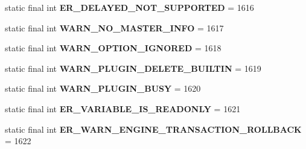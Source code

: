 \begin{DoxyCompactItemize}
\item 
\mbox{\label{classcom_1_1mysql_1_1jdbc_1_1_mysql_error_numbers_ac396818a5c4ef11518d486df9efae086}} 
static final int {\bfseries E\+R\+\_\+\+D\+E\+L\+A\+Y\+E\+D\+\_\+\+N\+O\+T\+\_\+\+S\+U\+P\+P\+O\+R\+T\+ED} = 1616
\item 
\mbox{\label{classcom_1_1mysql_1_1jdbc_1_1_mysql_error_numbers_a663931d5bfd87c909948b18f526e1e4d}} 
static final int {\bfseries W\+A\+R\+N\+\_\+\+N\+O\+\_\+\+M\+A\+S\+T\+E\+R\+\_\+\+I\+N\+FO} = 1617
\item 
\mbox{\label{classcom_1_1mysql_1_1jdbc_1_1_mysql_error_numbers_a7ef3656599623990e671daf94a96783d}} 
static final int {\bfseries W\+A\+R\+N\+\_\+\+O\+P\+T\+I\+O\+N\+\_\+\+I\+G\+N\+O\+R\+ED} = 1618
\item 
\mbox{\label{classcom_1_1mysql_1_1jdbc_1_1_mysql_error_numbers_a14f0162bad05281374c4ade03df44727}} 
static final int {\bfseries W\+A\+R\+N\+\_\+\+P\+L\+U\+G\+I\+N\+\_\+\+D\+E\+L\+E\+T\+E\+\_\+\+B\+U\+I\+L\+T\+IN} = 1619
\item 
\mbox{\label{classcom_1_1mysql_1_1jdbc_1_1_mysql_error_numbers_af66c21b2e3e7bbca2f5fe49baef085d7}} 
static final int {\bfseries W\+A\+R\+N\+\_\+\+P\+L\+U\+G\+I\+N\+\_\+\+B\+U\+SY} = 1620
\item 
\mbox{\label{classcom_1_1mysql_1_1jdbc_1_1_mysql_error_numbers_a4d0851e7e2a830c56e5d4067943a2699}} 
static final int {\bfseries E\+R\+\_\+\+V\+A\+R\+I\+A\+B\+L\+E\+\_\+\+I\+S\+\_\+\+R\+E\+A\+D\+O\+N\+LY} = 1621
\item 
\mbox{\label{classcom_1_1mysql_1_1jdbc_1_1_mysql_error_numbers_a21e0de896577377daee89e2cdd3c7f32}} 
static final int {\bfseries E\+R\+\_\+\+W\+A\+R\+N\+\_\+\+E\+N\+G\+I\+N\+E\+\_\+\+T\+R\+A\+N\+S\+A\+C\+T\+I\+O\+N\+\_\+\+R\+O\+L\+L\+B\+A\+CK} = 1622
\item 
\mbox{\label{classcom_1_1mysql_1_1jdbc_1_1_mysql_error_numbers_aa22e7fb85fbbd2491d730a6ae0783c44}} 

\end{DoxyCompactItemize}
